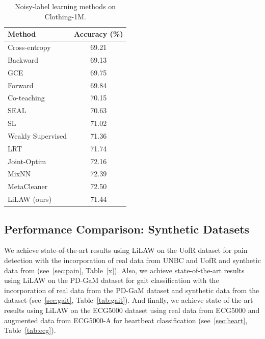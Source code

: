 \documentclass{article}
\theoremstyle{plain}
\theoremstyle{definition}
\theoremstyle{remark}
\begin{document}
\begin{table}[h!]
\centering
\begin{footnotesize}
\begin{tabular}{l|c}
\toprule
\textbf{Method} & \textbf{Accuracy (\%)} \\
\midrule
Cross-entropy & 69.21 \\
\midrule
Backward \citep{patrini2016making} & 69.13 \\
GCE \citep{zhang2018generalized} & 69.75 \\
Forward \citep{patrini2016making} & 69.84 \\
Co-teaching \citep{han2018co} & 70.15 \\
SEAL \citep{chen2021beyond} & 70.63 \\
SL \citep{wang2019symmetric} & 71.02 \\
Weakly Supervised \citep{zhang2019metacleaner} & 71.36 \\
LRT \citep{zheng2020error} & 71.74 \\
Joint-Optim \citep{tanaka2018joint} & 72.16 \\
MixNN \citep{lu2024mitigating} & 72.39 \\
MetaCleaner \citep{zhang2019metacleaner} & 72.50 \\ 
\midrule
LiLAW (ours) & 71.44 \\
\bottomrule
\end{tabular}
\caption{Noisy-label learning methods on Clothing-1M.}
\label{tab:noisy_label_results}
\end{footnotesize}
\vspace{-2.1em}
\end{table}

\subsection{Performance Comparison: Synthetic Datasets}
\label{sec:synthetic}

We achieve state-of-the-art results using LiLAW on the UofR dataset for pain detection with the incorporation of real data from UNBC and UofR and synthetic data from \synpain (see~\ref{sec:pain}, Table~\ref{x}). Also, we achieve state-of-the-art results using LiLAW on the PD-GaM dataset for gait classification with the incorporation of real data from the PD-GaM dataset and synthetic data from the \gaitgen dataset (see~\ref{sec:gait}, Table~\ref{tab:gait}). And finally, we achieve state-of-the-art results using LiLAW on the ECG5000 dataset using real data from ECG5000 and augmented data from ECG5000-A for heartbeat classification (see~\ref{sec:heart}, Table~\ref{tab:ecg}).
\end{document}
